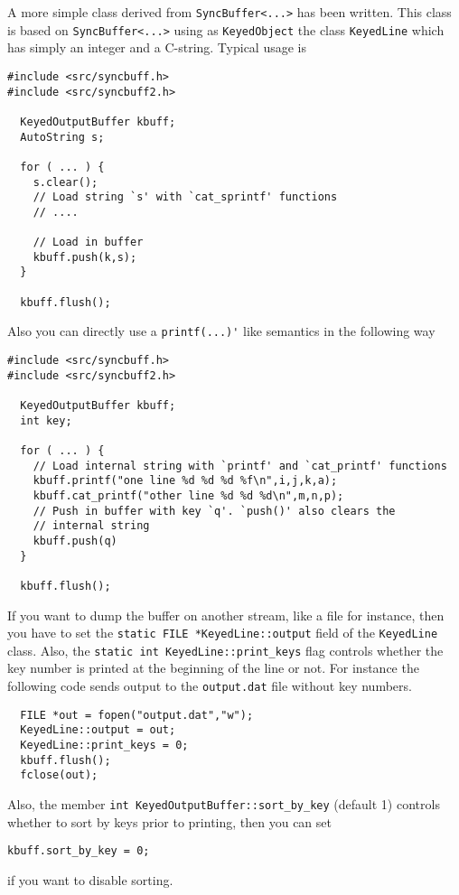 
A more simple class derived from \verb+SyncBuffer<...>+ has been
written. This class is based on \verb+SyncBuffer<...>+ using as
\verb+KeyedObject+ the class \verb+KeyedLine+ which has simply an
integer and a C-string. Typical usage is
%
\begin{verbatim}
#include <src/syncbuff.h>
#include <src/syncbuff2.h>

  KeyedOutputBuffer kbuff;
  AutoString s;

  for ( ... ) {
    s.clear();
    // Load string `s' with `cat_sprintf' functions
    // ....

    // Load in buffer
    kbuff.push(k,s);
  }

  kbuff.flush();
\end{verbatim}
%
Also you can directly use a \verb+printf(...)'+ like semantics in the
following way
%
\begin{verbatim}
#include <src/syncbuff.h>
#include <src/syncbuff2.h>

  KeyedOutputBuffer kbuff;
  int key;

  for ( ... ) {
    // Load internal string with `printf' and `cat_printf' functions
    kbuff.printf("one line %d %d %d %f\n",i,j,k,a);
    kbuff.cat_printf("other line %d %d %d\n",m,n,p);
    // Push in buffer with key `q'. `push()' also clears the
    // internal string
    kbuff.push(q)
  }

  kbuff.flush();
\end{verbatim}

If you want to dump the buffer on another stream, like a file for
instance, then you have to set the
\verb+static FILE *KeyedLine::output+ field of the \verb+KeyedLine+
class. Also, the \verb+static int KeyedLine::print_keys+ flag controls
whether the key number is printed at the beginning of the line or
not. For instance the following code sends output to the
\verb+output.dat+ file without key numbers. 
%
\begin{verbatim}
  FILE *out = fopen("output.dat","w");
  KeyedLine::output = out;
  KeyedLine::print_keys = 0;
  kbuff.flush();
  fclose(out);
\end{verbatim}
%
Also, the member \verb+int KeyedOutputBuffer::sort_by_key+ (default 1)
controls whether to sort by keys prior to printing, then you can set 
%
\begin{verbatim}
kbuff.sort_by_key = 0;
\end{verbatim}
%
if you want to disable sorting. 

